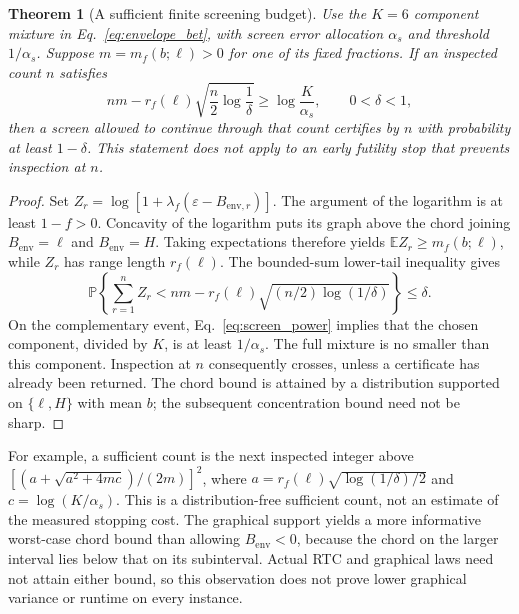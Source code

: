 \documentclass[preprint,11pt,sort&compress]{elsarticle}
\newtheorem{theorem}{Theorem}
\newcommand{\E}{\mathbb E}
\newcommand{\Prob}{\mathbb{P}}
\begin{document}
\begin{theorem}[A sufficient finite screening budget]
\label{thm:screen_power}
Use the $K=6$ component mixture in Eq.~\ref{eq:envelope_bet}, with screen
error allocation $\alpha_s$ and threshold $1/\alpha_s$. Suppose
$m=m_f(b;\ell)>0$ for one of its fixed fractions. If an inspected count $n$
satisfies
\begin{equation}
 nm-r_f(\ell)\sqrt{\frac n2\log\frac1\delta}
       \ge\log\frac K{\alpha_s},\qquad 0<\delta<1,
 \label{eq:screen_power}
\end{equation}
then a screen allowed to continue through that count certifies by $n$ with
probability at least $1-\delta$. This statement does not apply to an early
futility stop that prevents inspection at $n$.
\end{theorem}
\begin{proof}
Set $Z_r=\log[1+\lambda_f(\varepsilon-B_{\mathrm{env},r})]$. The argument of the logarithm
is at least $1-f>0$. Concavity of the logarithm puts its graph above the
chord joining $B_{\mathrm{env}}=\ell$ and $B_{\mathrm{env}}=H$. Taking expectations therefore yields
$\E Z_r\ge m_f(b;\ell)$, while $Z_r$ has range length $r_f(\ell)$.
The bounded-sum lower-tail inequality gives
\[
 \Prob\!\left\{\sum_{r=1}^n Z_r< nm-r_f(\ell)
                  \sqrt{(n/2)\log(1/\delta)}\right\}\le\delta.
\]
On the complementary event, Eq.~\ref{eq:screen_power} implies that the
chosen component, divided by $K$, is at least $1/\alpha_s$. The full
mixture is no smaller than this component. Inspection at $n$ consequently
crosses, unless a certificate has already been returned. The chord bound
is attained by a distribution supported on $\{\ell,H\}$ with mean $b$;
the subsequent concentration bound need not be sharp.
\end{proof}
For example, a sufficient count is the next inspected integer above
$[(a+\sqrt{a^2+4mc})/(2m)]^2$, where
$a=r_f(\ell)\sqrt{\log(1/\delta)/2}$ and
$c=\log(K/\alpha_s)$. This is a distribution-free sufficient count, not an
estimate of the measured stopping cost. The graphical support yields a
more informative worst-case chord bound than allowing $B_{\mathrm{env}}<0$, because the
chord on the larger interval lies below that on its subinterval. Actual
RTC and graphical laws need not attain either bound, so this observation
does not prove lower graphical variance or runtime on every instance.
\end{document}
